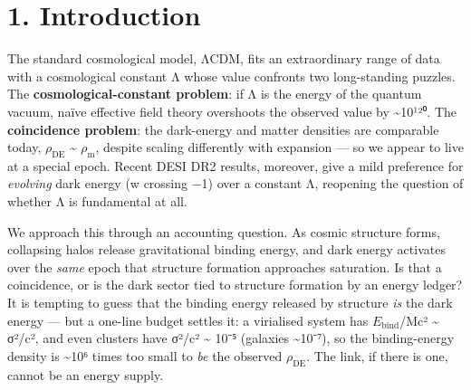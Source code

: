 \documentclass[
  10pt,
]{article}
\begin{document}
{
\hypersetup{linkcolor=}
\setcounter{tocdepth}{2}
\tableofcontents
}
\section{1. Introduction}\label{introduction}

The standard cosmological model, ΛCDM, fits an extraordinary range of
data with a cosmological constant Λ whose value confronts two
long-standing puzzles. The \textbf{cosmological-constant problem}: if Λ
is the energy of the quantum vacuum, naïve effective field theory
overshoots the observed value by \textasciitilde10¹²⁰. The
\textbf{coincidence problem}: the dark-energy and matter densities are
comparable today, \(\rho _{\mathrm{DE}}\) \textasciitilde{}
\(\rho _{\mathrm{m}}\), despite scaling differently with expansion ---
so we appear to live at a special epoch. Recent DESI DR2 results,
moreover, give a mild preference for \emph{evolving} dark energy (w
crossing −1) over a constant Λ, reopening the question of whether Λ is
fundamental at all.

We approach this through an accounting question. As cosmic structure
forms, collapsing halos release gravitational binding energy, and dark
energy activates over the \emph{same} epoch that structure formation
approaches saturation. Is that a coincidence, or is the dark sector tied
to structure formation by an energy ledger? It is tempting to guess that
the binding energy released by structure \emph{is} the dark energy ---
but a one-line budget settles it: a virialised system has
\textbar{}\(E_{\mathrm{bind}}\)\textbar/Mc² \textasciitilde{} σ²/c², and
even clusters have σ²/c² \textasciitilde{} 10⁻⁵ (galaxies
\textasciitilde10⁻⁷), so the binding-energy density is
\textasciitilde10⁶ times too small to \emph{be} the observed
\(\rho _{\mathrm{DE}}\). The link, if there is one, cannot be an energy
supply.
\end{document}
